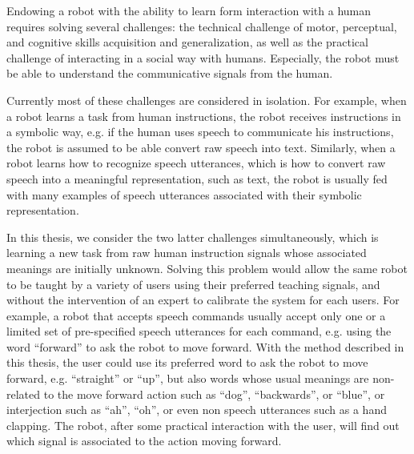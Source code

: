 Endowing a robot with the ability to learn form interaction with a human requires solving several challenges: the technical challenge of motor, perceptual, and cognitive skills acquisition and generalization, as well as the practical challenge of interacting in a social way with humans.
Especially, the robot must be able to understand the communicative signals from the human.


Currently most of these challenges are considered in isolation. For example, when a robot learns a task from human instructions, the robot receives instructions in a symbolic way, e.g. if the human uses speech to communicate his instructions, the robot is assumed to be able convert raw speech into text. Similarly, when a robot learns how to recognize speech utterances, which is how to convert raw speech into a meaningful representation, such as text, the robot is usually fed with many examples of speech utterances associated with their symbolic representation.

In this thesis, we consider the two latter challenges simultaneously, which is learning a new task from raw human instruction signals whose associated meanings are initially unknown. Solving this problem would allow the same robot to be taught by a variety of users using their preferred teaching signals, and without the intervention of an expert to calibrate the system 
for each users. For example, a robot that accepts speech commands usually accept only one or a limited set of pre-specified speech utterances for each command, e.g. using the word ``forward'' to ask the robot to move forward. With the method described in this thesis, the user could use its preferred word to ask the robot to move forward, e.g. ``straight'' or ``up'', but also words whose usual meanings are non-related to the move forward action such as ``dog'', ``backwards'', or ``blue'', or interjection such as ``ah'', ``oh'', or even non speech utterances such as a hand clapping. The robot, after some practical interaction with the user, will find out which signal is associated to the action moving forward.

